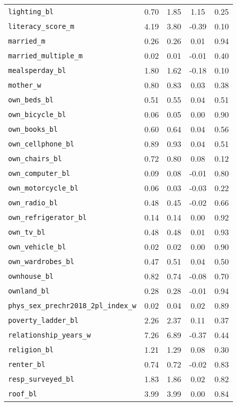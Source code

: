 \begin{longtable}{lcccc}
\addlinespace
\texttt{lighting\_bl} & 0.70 & 1.85 & 1.15 & 0.25\\
\texttt{literacy\_score\_m} & 4.19 & 3.80 & -0.39 & 0.10\\
\texttt{married\_m} & 0.26 & 0.26 & 0.01 & 0.94\\
\texttt{married\_multiple\_m} & 0.02 & 0.01 & -0.01 & 0.40\\
\texttt{mealsperday\_bl} & 1.80 & 1.62 & -0.18 & 0.10\\
\addlinespace
\texttt{mother\_w} & 0.80 & 0.83 & 0.03 & 0.38\\
\texttt{own\_beds\_bl} & 0.51 & 0.55 & 0.04 & 0.51\\
\texttt{own\_bicycle\_bl} & 0.06 & 0.05 & 0.00 & 0.90\\
\texttt{own\_books\_bl} & 0.60 & 0.64 & 0.04 & 0.56\\
\texttt{own\_cellphone\_bl} & 0.89 & 0.93 & 0.04 & 0.51\\
\addlinespace
\texttt{own\_chairs\_bl} & 0.72 & 0.80 & 0.08 & 0.12\\
\texttt{own\_computer\_bl} & 0.09 & 0.08 & -0.01 & 0.80\\
\texttt{own\_motorcycle\_bl} & 0.06 & 0.03 & -0.03 & 0.22\\
\texttt{own\_radio\_bl} & 0.48 & 0.45 & -0.02 & 0.66\\
\texttt{own\_refrigerator\_bl} & 0.14 & 0.14 & 0.00 & 0.92\\
\addlinespace
\texttt{own\_tv\_bl} & 0.48 & 0.48 & 0.01 & 0.93\\
\texttt{own\_vehicle\_bl} & 0.02 & 0.02 & 0.00 & 0.90\\
\texttt{own\_wardrobes\_bl} & 0.47 & 0.51 & 0.04 & 0.50\\
\texttt{ownhouse\_bl} & 0.82 & 0.74 & -0.08 & 0.70\\
\texttt{ownland\_bl} & 0.28 & 0.28 & -0.01 & 0.94\\
\addlinespace
\texttt{phys\_sex\_prechr2018\_2pl\_index\_w} & 0.02 & 0.04 & 0.02 & 0.89\\
\texttt{poverty\_ladder\_bl} & 2.26 & 2.37 & 0.11 & 0.37\\
\texttt{relationship\_years\_w} & 7.26 & 6.89 & -0.37 & 0.44\\
\texttt{religion\_bl} & 1.21 & 1.29 & 0.08 & 0.30\\
\texttt{renter\_bl} & 0.74 & 0.72 & -0.02 & 0.83\\
\addlinespace
\texttt{resp\_surveyed\_bl} & 1.83 & 1.86 & 0.02 & 0.82\\
\texttt{roof\_bl} & 3.99 & 3.99 & 0.00 & 0.84\\

\end{longtable}

